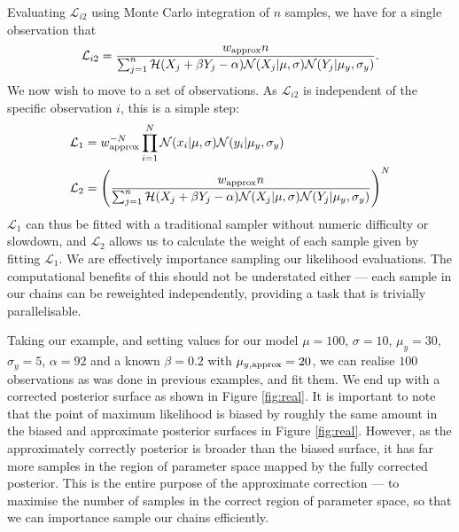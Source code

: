 \documentclass[a4paper,fleqn,usenatbib]{mnras}
\begin{document}
Evaluating $\mathcal{L}_{i2}$ using Monte Carlo integration of $n$ samples, we have for a single observation that
\begin{align}
\mathcal{L}_{i2} = \frac{ w_{\rm approx}  n }{\sum_{j=1}^{n} \mathcal{H}(X_j + \beta Y_j - \alpha) \mathcal{N}(X_j|\mu, \sigma) \mathcal{N}(Y_j|\mu_y, \sigma_y)} \label{eq:mc}.
\end{align}
We now wish to move to a set of observations. As $\mathcal{L}_{i2}$ is independent of the specific observation $i$, this is a simple step:
\begin{align}
\mathcal{L}_1 &= w_{\rm approx}^{-N} \prod_{i=1}^N \mathcal{N}(x_i|\mu, \sigma) \mathcal{N}(y_i|\mu_y, \sigma_y) \\
\mathcal{L}_{2} &= \left(  \frac{ w_{\rm approx}  n }{\sum_{j=1}^{n} \mathcal{H}(X_j + \beta Y_j - \alpha) \mathcal{N}(X_j|\mu, \sigma) \mathcal{N}(Y_j|\mu_y, \sigma_y)}\right)^N
\end{align}
$\mathcal{L}_1$ can thus be fitted with a traditional sampler without numeric difficulty or slowdown, and $\mathcal{L}_2$ allows us to calculate the weight of each sample given by fitting $\mathcal{L}_{1}$. We are effectively importance sampling our likelihood evaluations. The computational benefits of this should not be understated either --- each sample in our chains can be reweighted independently, providing a task that is trivially parallelisable. 

Taking our example, and setting values for our model  $\mu = 100$, $\sigma = 10$, $\mu_y = 30$, $\sigma_y = 5$, $\alpha=92$ and a known $\beta = 0.2$ with $\mu_{y, {\rm approx}} = 20$, we can realise $100$ observations as was done in previous examples, and fit them. We end up with a corrected posterior surface as shown in Figure \ref{fig:real}. It is important to note that the point of maximum likelihood is biased by roughly the same amount in the biased and approximate posterior surfaces in Figure \ref{fig:real}. However, as the approximately correctly posterior is broader than the biased surface, it has far more samples in the region of parameter space mapped by the fully corrected posterior. This is the entire purpose of the approximate correction --- to maximise the number of samples in the correct region of parameter space, so that we can importance sample our chains efficiently.
\end{document}
